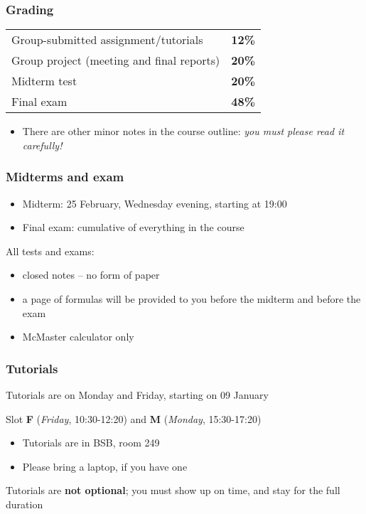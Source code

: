 \begin{frame}\frametitle{Grading}
	\begin{tabular}{lc}
		Group-submitted assignment/tutorials 					& \textbf{12\%} \\
		Group project (meeting and final reports)				& \textbf{20\%} \\
		Midterm test											& \textbf{20\%} \\
		Final exam												& \textbf{48\%} \\
	\end{tabular}

	\vspace{24pt}
	\begin{itemize}
		\item	There are other minor notes in the course outline: \emph{{\color{myOrange}you must please read it carefully!}}
	\end{itemize}
\end{frame}

\begin{frame}\frametitle{Midterms and exam}

	\begin{itemize}
		\item	Midterm: 25 February, Wednesday evening, starting at 19:00
		
		\vspace{12pt}
		\item	Final exam: cumulative of everything in the course
	\end{itemize}

	\vspace{24pt}
	All tests and exams:
	\begin{itemize}
		\item	closed notes -- no form of paper
		\item	a page of formulas will be provided to you before the midterm and before the exam
		\item	McMaster calculator only
	\end{itemize}
\end{frame}

\begin{frame}\frametitle{Tutorials}
	Tutorials are on Monday and Friday, starting on 09 January
	
	\vspace{12pt}
	Slot \textbf{F} (\emph{Friday}, 10:30-12:20) and \textbf{M} (\emph{Monday}, 15:30-17:20) 

	\begin{itemize}
		\item	Tutorials are in BSB, room 249
		\item	Please bring a laptop, if you have one
	\end{itemize}
	
	\pause
	\begin{exampleblock}{}
		\centering
		{\color{red}Tutorials are \textbf{not optional};} you must show up on time, and stay for the full duration
	\end{exampleblock}
\end{frame}

